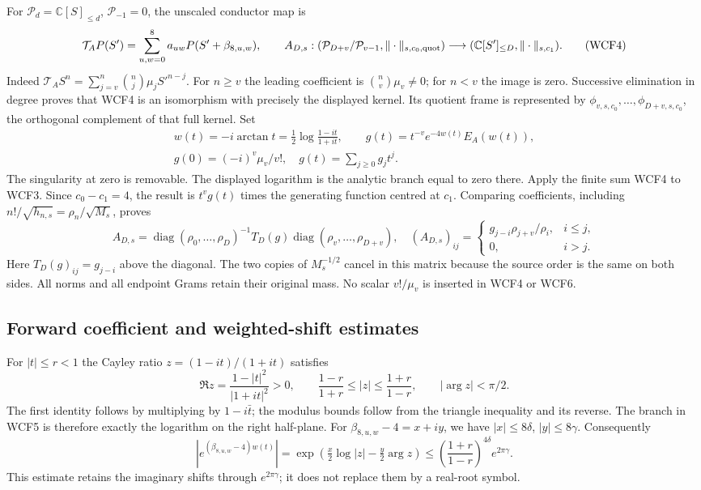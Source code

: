 For $\mathcal P_d=\mathbb C[S]_{\le d}$, $\mathcal P_{-1}=0$, the
unscaled conductor map is
\[
 \mathcal T_A P(S')=\sum_{u,w=0}^{8}a_{uw}P(S'+\beta_{8,u,w}),\qquad
 A_{D,s}:(\mathcal P_{D+v}/\mathcal P_{v-1},\|\cdot\|_{s,c_0,\rm quot})
       \longrightarrow(\mathbb C[S']_{\le D},\|\cdot\|_{s,c_1}).
 \tag{WCF4}
\]
Indeed $\mathcal T_A S^n=\sum_{j=v}^n\binom nj\mu_j S'^{n-j}$.
For $n\ge v$ the leading coefficient is $\binom nv\mu_v\ne0$;
for $n<v$ the image is zero. Successive elimination in degree proves
that WCF4 is an isomorphism with precisely the displayed kernel.
Its quotient frame is represented by
$\phi_{v,s,c_0},\ldots,\phi_{D+v,s,c_0}$, the orthogonal complement
of that full kernel. Set
\[
\begin{gathered}
 w(t)=-i\arctan t=\tfrac12\log\frac{1-it}{1+it},\qquad
 g(t)=t^{-v}e^{-4w(t)}E_A(w(t)),\\
 g(0)=(-i)^v\mu_v/v!,\quad g(t)=\sum_{j\ge0}g_jt^j.
\end{gathered}
 \tag{WCF5}
\]
The singularity at zero is removable. The displayed logarithm is the
analytic branch equal to zero there. Apply the finite sum WCF4 to WCF3.
Since $c_0-c_1=4$, the result is $t^vg(t)$ times the generating
function centred at $c_1$. Comparing coefficients, including
$n!/\sqrt{h_{n,s}}=\rho_n/\sqrt{M_s}$, proves
\[
 A_{D,s}=\operatorname{diag}(\rho_0,\ldots,\rho_D)^{-1}
          T_D(g)\operatorname{diag}(\rho_v,\ldots,\rho_{D+v}),
 \quad
 (A_{D,s})_{ij}=\begin{cases}g_{j-i}\rho_{j+v}/\rho_i,&i\le j,\\0,&i>j.
 \end{cases}
 \tag{WCF6}
\]
Here $T_D(g)_{ij}=g_{j-i}$ above the diagonal. The two copies of
$M_s^{-1/2}$ cancel in this matrix because the source order is the same
on both sides. All norms and all endpoint Grams retain their original
mass. No scalar $v!/\mu_v$ is inserted in WCF4 or WCF6.

\subsection{Forward coefficient and weighted-shift estimates}

For $|t|\le r<1$ the Cayley ratio $z=(1-it)/(1+it)$ satisfies
\[
 \Re z=\frac{1-|t|^2}{|1+it|^2}>0,\qquad
 \frac{1-r}{1+r}\le|z|\le\frac{1+r}{1-r},\qquad
 |\arg z|<\pi/2.
 \tag{WCF7}
\]
The first identity follows by multiplying by $1-i\bar t$; the
modulus bounds follow from the triangle inequality and its reverse.
The branch in WCF5 is therefore exactly the logarithm on the right
half-plane. For $\beta_{8,u,w}-4=x+iy$, we have
$|x|\le8\delta$, $|y|\le8\gamma$. Consequently
\[
 \left|e^{(\beta_{8,u,w}-4)w(t)}\right|
 =\exp\!\left(\tfrac{x}{2}\log|z|-\tfrac{y}{2}\arg z\right)
 \le\left(\frac{1+r}{1-r}\right)^{4\delta}e^{2\pi\gamma}.
 \tag{WCF8}
\]
This estimate retains the imaginary shifts through $e^{2\pi\gamma}$;
it does not replace them by a real-root symbol.

